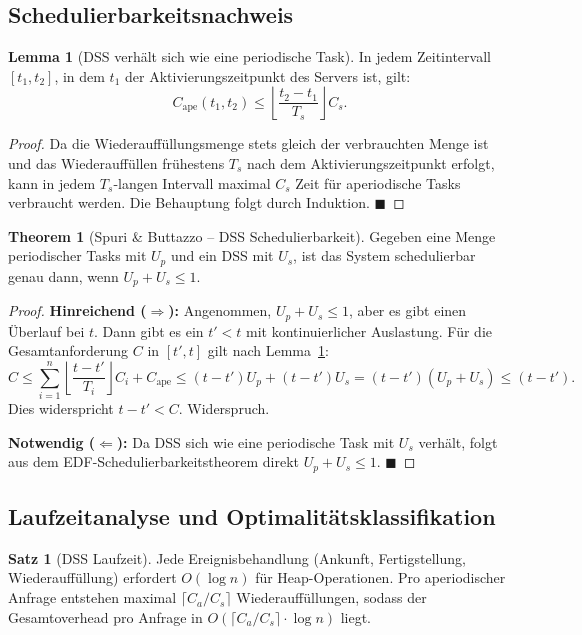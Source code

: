 ﻿\documentclass[a4paper,12pt]{report}
\theoremstyle{definition}
\newtheorem{satz}{Satz}[chapter]
\newtheorem{lemma}{Lemma}[chapter]
\newtheorem{theorem}{Theorem}[chapter]
\begin{document}
\subsection{Schedulierbarkeitsnachweis}

\begin{lemma}[DSS verhält sich wie eine periodische Task]
	\label{lem:dss_periodic}
	In jedem Zeitintervall $[t_1, t_2]$, in dem $t_1$ der Aktivierungszeitpunkt
	des Servers ist, gilt:
	\[
		C_{\mathrm{ape}}(t_1, t_2) \leq \left\lfloor \frac{t_2 - t_1}{T_s} \right\rfloor C_s.
	\]
\end{lemma}

\begin{proof}
	Da die Wiederauffüllungsmenge stets gleich der verbrauchten Menge ist und
	das Wiederauffüllen frühestens $T_s$ nach dem Aktivierungszeitpunkt erfolgt,
	kann in jedem $T_s$-langen Intervall maximal $C_s$ Zeit für aperiodische
	Tasks verbraucht werden. Die Behauptung folgt durch Induktion. \hfill$\blacksquare$
\end{proof}

\begin{theorem}[Spuri \& Buttazzo -- DSS Schedulierbarkeit]
	\label{thm:dss}
	Gegeben eine Menge periodischer Tasks mit $U_p$ und ein DSS mit $U_s$, ist
	das System schedulierbar genau dann, wenn $U_p + U_s \leq 1$.
\end{theorem}

\begin{proof}
	\textbf{Hinreichend ($\Rightarrow$):} Angenommen, $U_p + U_s \leq 1$, aber
	es gibt einen Überlauf bei $t$. Dann gibt es ein $t' < t$ mit kontinuierlicher
	Auslastung. Für die Gesamtanforderung $C$ in $[t', t]$ gilt nach
	Lemma~\ref{lem:dss_periodic}:
	\[
		C \leq \sum_{i=1}^n \left\lfloor \frac{t-t'}{T_i} \right\rfloor C_i + C_{\mathrm{ape}}
		\leq (t-t') U_p + (t-t') U_s = (t-t')(U_p+U_s) \leq (t-t').
	\]
	Dies widerspricht $t-t' < C$. Widerspruch.

	\textbf{Notwendig ($\Leftarrow$):} Da DSS sich wie eine periodische Task mit
	$U_s$ verhält, folgt aus dem EDF-Schedulierbarkeitstheorem direkt $U_p + U_s \leq 1$. \hfill$\blacksquare$
\end{proof}

\subsection{Laufzeitanalyse und Optimalitätsklassifikation}

\begin{satz}[DSS Laufzeit]
	Jede Ereignisbehandlung (Ankunft, Fertigstellung, Wiederauffüllung) erfordert
	$O(\log n)$ für Heap-Operationen. Pro aperiodischer Anfrage entstehen maximal
	$\lceil C_a/C_s \rceil$ Wiederauffüllungen, sodass der Gesamtoverhead
	pro Anfrage in $O(\lceil C_a/C_s \rceil \cdot \log n)$ liegt.
\end{satz}
\end{document}
